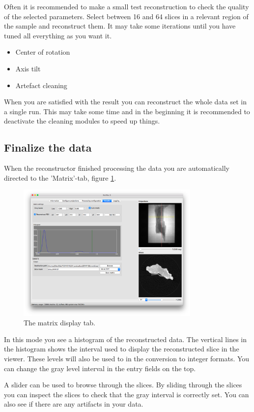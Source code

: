 \documentclass[a4paper]{scrreprt}
\begin{document}
Often it is recommended to make a small test reconstruction to check the quality of the selected parameters. Select between 16 and 64 slices in a relevant region of the sample and reconstruct them. It may take some iterations until you have
tuned all everything as you want it. 
\begin{itemize}
\item Center of rotation
\item Axis tilt
\item Artefact cleaning
\end{itemize}
When you are satisfied with the result you can reconstruct the whole data set in a single run. This may take some time and in the beginning it is recommended to deactivate the cleaning modules to speed up things.

\subsection{Finalize the data}
When the reconstructor finished processing the data you are automatically directed to the 'Matrix'-tab, figure \ref{fig_matrixtab}.
\begin{figure}
 \centering
\includegraphics[width=0.8\textwidth]{figures3/Main_Results.png}
\caption{The matrix display tab.}\label{fig_matrixtab}
\end{figure}

In this mode you see a histogram of the reconstructed data. The vertical lines in the histogram shows the interval used
to display the reconstructed slice in the viewer. These levels will also be used to in the conversion to integer formats. You can change the gray level interval in the entry fields on the top.

A slider can be used to browse through the slices. By sliding through the slices you can inspect the slices to check that the gray interval is correctly set. You can also see if there are any artifacts in your data.
\end{document}
